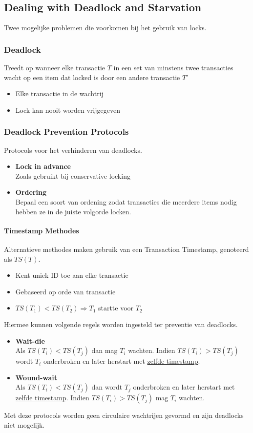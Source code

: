 \subsection{Dealing with Deadlock and Starvation}%
Twee mogelijke problemen die voorkomen bij het gebruik van locks.

\subsubsection{Deadlock}
Treedt op wanneer elke transactie $T$ in een set van minstens twee transacties wacht op een item dat locked is door een andere transactie $T'$
\begin{itemize}
	\item Elke transactie in de wachtrij
	\item Lock kan nooit worden vrijgegeven
\end{itemize}

\subsubsection{Deadlock Prevention Protocols}
Protocols voor het verhinderen van deadlocks.
\begin{itemize}
	\item \textbf{Lock in advance} \\ Zoals gebruikt bij conservative locking
	\item \textbf{Ordering} \\ Bepaal een soort van ordening zodat transacties die meerdere items nodig hebben ze in de juiste volgorde locken.
\end{itemize}
\paragraph{Timestamp Methodes} Alternatieve methodes maken gebruik van een Transaction Timestamp, genoteerd als $TS(T)$. \
\begin{itemize}
	\item Kent uniek ID toe aan elke transactie
	\item Gebaseerd op orde van transactie
	\item $TS(T_1) < TS(T_2) \Rightarrow T_1$ startte voor $T_2$
\end{itemize}
Hiermee kunnen volgende regels worden ingesteld ter preventie van deadlocks.
\begin{itemize}
	\item \textbf{Wait-die} \\ Als $TS(T_i) < TS(T_j)$ dan mag $T_i$ wachten. Indien $TS(T_i) > TS(T_j)$ wordt $T_i$ onderbroken en later herstart met \underline{zelfde timestamp}.
	\item \textbf{Wound-wait} \\ Als $TS(T_i) < TS(T_j)$ dan wordt $T_j$ onderbroken en later herstart met \underline{zelfde timestamp}. Indien $TS(T_i) > TS(T_j)$ mag $T_i$ wachten.
\end{itemize}
Met deze protocols worden geen circulaire wachtrijen gevormd en zijn deadlocks niet mogelijk.
